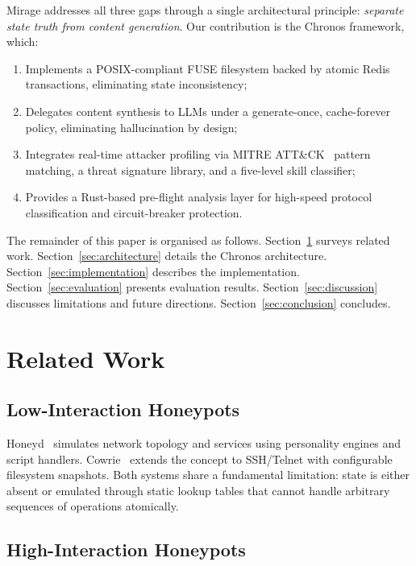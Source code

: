 \documentclass[conference]{IEEEtran}
\begin{document}
Mirage addresses all three gaps through a single architectural principle: \emph{separate state truth from content generation}.
Our contribution is the Chronos framework, which:
\begin{enumerate}[noitemsep]
  \item Implements a POSIX-compliant FUSE filesystem backed by atomic Redis transactions, eliminating state inconsistency;
  \item Delegates content synthesis to LLMs under a generate-once, cache-forever policy, eliminating hallucination by design;
  \item Integrates real-time attacker profiling via MITRE ATT\&CK~\cite{mitre2023attack} pattern matching, a threat signature library, and a five-level skill classifier;
  \item Provides a Rust-based pre-flight analysis layer for high-speed protocol classification and circuit-breaker protection.
\end{enumerate}

The remainder of this paper is organised as follows.
Section~\ref{sec:related} surveys related work.
Section~\ref{sec:architecture} details the Chronos architecture.
Section~\ref{sec:implementation} describes the implementation.
Section~\ref{sec:evaluation} presents evaluation results.
Section~\ref{sec:discussion} discusses limitations and future directions.
Section~\ref{sec:conclusion} concludes.

\section{Related Work}
\label{sec:related}

\subsection{Low-Interaction Honeypots}

Honeyd~\cite{provos2003virtual} simulates network topology and services using personality engines and script handlers.
Cowrie~\cite{cowrie2019} extends the concept to SSH/Telnet with configurable filesystem snapshots.
Both systems share a fundamental limitation: state is either absent or emulated through static lookup tables that cannot handle arbitrary sequences of operations atomically.

\subsection{High-Interaction Honeypots}
\end{document}
